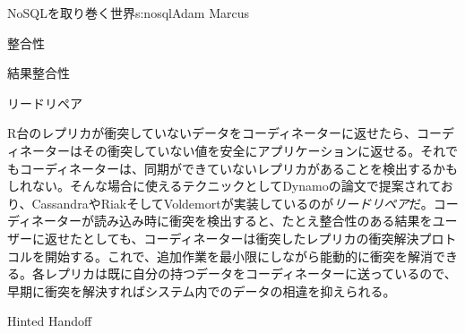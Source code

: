 \begin{aosachapter}{NoSQLを取り巻く世界}{s:nosql}{Adam Marcus}
\begin{aosasect1}{整合性}
\begin{aosasect2}{結果整合性}
\begin{aosasect3}{リードリペア}

R台のレプリカが衝突していないデータをコーディネーターに返せたら、コーディネーターはその衝突していない値を安全にアプリケーションに返せる。それでもコーディネーターは、同期ができていないレプリカがあることを検出するかもしれない。そんな場合に使えるテクニックとしてDynamoの論文で提案されており、CassandraやRiakそしてVoldemortが実装しているのが\emph{リードリペア}だ。コーディネーターが読み込み時に衝突を検出すると、たとえ整合性のある結果をユーザーに返せたとしても、コーディネーターは衝突したレプリカの衝突解決プロトコルを開始する。これで、追加作業を最小限にしながら能動的に衝突を解消できる。各レプリカは既に自分の持つデータをコーディネーターに送っているので、早期に衝突を解決すればシステム内でのデータの相違を抑えられる。

\end{aosasect3}

\begin{aosasect3}{Hinted Handoff}


\end{aosasect3}
\end{aosasect2}
\end{aosasect1}
\end{aosachapter}
